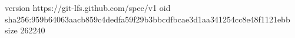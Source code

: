 version https://git-lfs.github.com/spec/v1
oid sha256:959b64063aacb859c4dedfa59f29b3bbcdfbcae3d1aa341254cc8e48f1121ebb
size 262240
